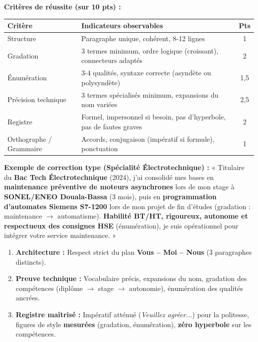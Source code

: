\documentclass[11pt]{article}
\begin{document}
\begin{corrige}[Exercice 1]
\textbf{Critères de réussite (sur 10 pts) :}
\begin{tabularx}{\linewidth}{|l|X|c|}\hline
\rowcolor{popblueL}
\textbf{Critère} & \textbf{Indicateurs observables} & \textbf{Pts} \\ \hline
Structure & Paragraphe unique, cohérent, 8-12 lignes & 1 \\ \hline
Gradation & 3 termes minimum, ordre logique (croissant), connecteurs adaptés & 2 \\ \hline
Énumération & 3-4 qualités, syntaxe correcte (asyndète ou polysyndète) & 1,5 \\ \hline
Précision technique & 3 termes spécialisés minimum, expansions du nom variées & 2,5 \\ \hline
Registre & Formel, impersonnel si besoin, pas d'hyperbole, pas de fautes graves & 2 \\ \hline
Orthographe / Grammaire & Accords, conjugaison (impératif si formule), ponctuation & 1 \\ \hline
\end{tabularx}
\textbf{Exemple de correction type (Spécialité Électrotechnique) :}
« Titulaire du \textbf{Bac Tech Électrotechnique} (2024), j'ai consolidé mes bases en \textbf{maintenance préventive de moteurs asynchrones} lors de mon stage à \textbf{SONEL/ENEO Douala-Bassa} (3 mois), puis en \textbf{programmation d'automates Siemens S7-1200} lors de mon projet de fin d'études (gradation : maintenance $\rightarrow$ automatisme). \textbf{Habilité BT/HT, rigoureux, autonome et respectueux des consignes HSE} (énumération), je suis opérationnel pour intégrer votre service maintenance. »
\end{corrige}

\begin{aretenir}
\begin{enumerate}
    \item \textbf{Architecture :} Respect strict du plan \textbf{Vous – Moi – Nous} (3 paragraphes distincts).
    \item \textbf{Preuve technique :} Vocabulaire précis, expansions du nom, gradation des compétences (diplôme $\rightarrow$ stage $\rightarrow$ autonomie), énumération des qualités ancrées.
    \item \textbf{Registre maîtrisé :} Impératif atténué (\textit{Veuillez agréer...}) pour la politesse, figures de style \textbf{mesurées} (gradation, énumération), \textbf{zéro hyperbole} sur les compétences.
\end{enumerate}
\end{aretenir}
\end{document}

